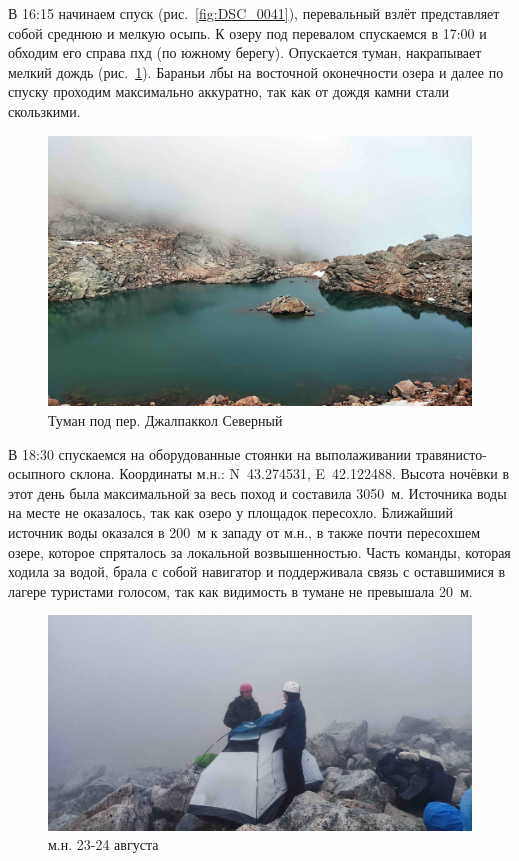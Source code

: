 В 16:15 начинаем спуск (рис.~\ref{fig:DSC_0041}), перевальный взлёт представляет собой среднюю и мелкую осыпь. К озеру под перевалом спускаемся в 17:00 и обходим его справа пхд (по южному берегу). Опускается туман, накрапывает мелкий дождь (рис.~\ref{fig:IMG_20240823_170306}). Бараньи лбы на восточной оконечности озера и далее по спуску проходим максимально аккуратно, так как от дождя камни стали скользкими.
 
\begin{figure}[h!]	
	\centering
	\includegraphics[angle=0, width=0.7\linewidth]{../pics/IMG_20240823_170306}
	\caption{Туман под пер. Джалпаккол Северный}
	\label{fig:IMG_20240823_170306}
\end{figure}

В 18:30 спускаемся на оборудованные стоянки на выполаживании травянисто-осыпного склона. Координаты м.н.: N~43.274531\degree, E~42.122488\degree. Высота ночёвки в этот день была максимальной за весь поход и составила 3050~м. Источника воды на месте не оказалось, так как озеро у площадок пересохло. Ближайший источник воды оказался в 200~м к западу от м.н., в также почти пересохшем озере, которое спряталось за локальной возвышенностью. Часть команды, которая ходила за водой, брала с собой навигатор и поддерживала связь с оставшимися в лагере туристами голосом, так как видимость в тумане не превышала 20~м.

\begin{figure}[h!]	
	\centering
	\includegraphics[angle=0, width=0.7\linewidth]{../pics/IMG_20240823_184041}
	\caption{м.н. 23-24 августа}
	\label{fig:IMG_20240823_184041}
\end{figure}


